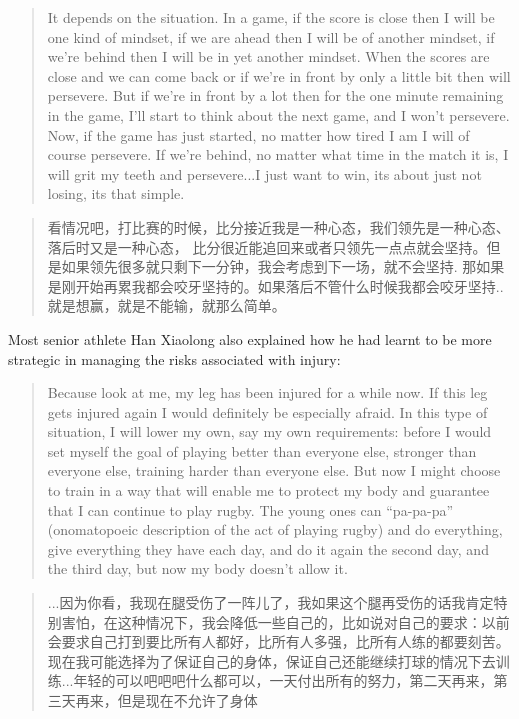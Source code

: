 \begin{CJK}{UTF8}{gbsn}
    \begin{quote}
      It depends on the situation.  In a game, if the score is close then I will be one kind of mindset, if we are ahead then I will be of another mindset, if we're behind then I will be in yet another mindset.  When the scores are close and we can come back or if we're in front by only a little bit then will persevere.  But if we're in front by a lot then for the one minute remaining in the game, I'll start to think about the next game, and I won't persevere.  Now, if the game has just started, no matter how tired I am I will of course persevere. If we're behind, no matter what time in the match it is, I will grit my teeth and persevere...I just want to win, its about just not losing, its that simple.
    \end{quote}

    \begin{quote}
      看情况吧，打比赛的时候，比分接近我是一种心态，我们领先是一种心态、落后时又是一种心态， 比分很近能追回来或者只领先一点点就会坚持。但是如果领先很多就只剩下一分钟，我会考虑到下一场，就不会坚持.  那如果是刚开始再累我都会咬牙坚持的。如果落后不管什么时候我都会咬牙坚持..就是想赢，就是不能输，就那么简单。
    \end{quote}

Most senior athlete Han Xiaolong also explained how he had learnt to be more strategic in managing the risks associated with injury:

    \begin{quote}
      Because look at me, my leg has been injured for a while now.  If this leg gets injured again I would definitely be especially afraid.  In this type of situation, I will lower my own, say my own requirements: before I would set myself the goal of playing better than everyone else, stronger than everyone else, training harder than everyone else.  But now I might choose to train in a way that will enable me to protect my body and guarantee that I can continue to play rugby.  The young ones can ``pa-pa-pa'' (onomatopoeic description of the act of playing rugby) and do everything, give everything they have each day, and do it again the second day, and the third day, but now my body doesn't allow it.
    \end{quote}

\begin{quote}
      ...因为你看，我现在腿受伤了一阵儿了，我如果这个腿再受伤的话我肯定特别害怕，在这种情况下，我会降低一些自己的，比如说对自己的要求：以前会要求自己打到要比所有人都好，比所有人多强，比所有人练的都要刻苦。现在我可能选择为了保证自己的身体，保证自己还能继续打球的情况下去训练...年轻的可以吧吧吧什么都可以，一天付出所有的努力，第二天再来，第三天再来，但是现在不允许了身体
\end{quote}


\end{CJK}
